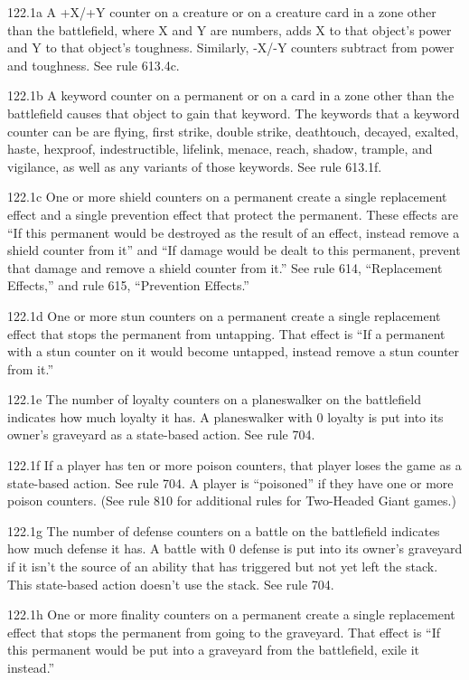 122.1a A +X/+Y counter on a creature or on a creature card in a zone other than the battlefield, where X and Y are numbers, adds X to that object’s power and Y to that object’s toughness. Similarly, -X/-Y counters subtract from power and toughness. See rule 613.4c.

122.1b A keyword counter on a permanent or on a card in a zone other than the battlefield causes that object to gain that keyword. The keywords that a keyword counter can be are flying, first strike, double strike, deathtouch, decayed, exalted, haste, hexproof, indestructible, lifelink, menace, reach, shadow, trample, and vigilance, as well as any variants of those keywords. See rule 613.1f.

122.1c One or more shield counters on a permanent create a single replacement effect and a single prevention effect that protect the permanent. These effects are “If this permanent would be destroyed as the result of an effect, instead remove a shield counter from it” and “If damage would be dealt to this permanent, prevent that damage and remove a shield counter from it.” See rule 614, “Replacement Effects,” and rule 615, “Prevention Effects.”

122.1d One or more stun counters on a permanent create a single replacement effect that stops the permanent from untapping. That effect is “If a permanent with a stun counter on it would become untapped, instead remove a stun counter from it.”

122.1e The number of loyalty counters on a planeswalker on the battlefield indicates how much loyalty it has. A planeswalker with 0 loyalty is put into its owner’s graveyard as a state-based action. See rule 704.

122.1f If a player has ten or more poison counters, that player loses the game as a state-based action. See rule 704. A player is “poisoned” if they have one or more poison counters. (See rule 810 for additional rules for Two-Headed Giant games.)

122.1g The number of defense counters on a battle on the battlefield indicates how much defense it has. A battle with 0 defense is put into its owner’s graveyard if it isn’t the source of an ability that has triggered but not yet left the stack. This state-based action doesn’t use the stack. See rule 704.

122.1h One or more finality counters on a permanent create a single replacement effect that stops the permanent from going to the graveyard. That effect is “If this permanent would be put into a graveyard from the battlefield, exile it instead.”

